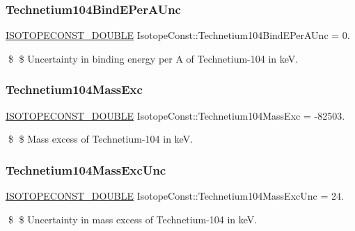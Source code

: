 \subsubsection{\texorpdfstring{Technetium104\+Bind\+E\+Per\+A\+Unc}{Technetium104BindEPerAUnc}}
{\footnotesize\ttfamily \mbox{\hyperlink{group___isotope_const-_macros_ga8f45a7272ce02c0b4c65c44636ed719a}{I\+S\+O\+T\+O\+P\+E\+C\+O\+N\+S\+T\+\_\+\+D\+O\+U\+B\+LE}} Isotope\+Const\+::\+Technetium104\+Bind\+E\+Per\+A\+Unc = 0.}

\$ \$ Uncertainty in binding energy per A of Technetium-\/104 in keV. \mbox{\label{group___isotope_const-_technetium-_tc104_ga6c5a60f6d5134017297d3fce356ab1af}} 
\subsubsection{\texorpdfstring{Technetium104\+Mass\+Exc}{Technetium104MassExc}}
{\footnotesize\ttfamily \mbox{\hyperlink{group___isotope_const-_macros_ga8f45a7272ce02c0b4c65c44636ed719a}{I\+S\+O\+T\+O\+P\+E\+C\+O\+N\+S\+T\+\_\+\+D\+O\+U\+B\+LE}} Isotope\+Const\+::\+Technetium104\+Mass\+Exc = -\/82503.}

\$ \$ Mass excess of Technetium-\/104 in keV. \mbox{\label{group___isotope_const-_technetium-_tc104_gae4fc82b143c40669958aa47e8b67c585}} 
\subsubsection{\texorpdfstring{Technetium104\+Mass\+Exc\+Unc}{Technetium104MassExcUnc}}
{\footnotesize\ttfamily \mbox{\hyperlink{group___isotope_const-_macros_ga8f45a7272ce02c0b4c65c44636ed719a}{I\+S\+O\+T\+O\+P\+E\+C\+O\+N\+S\+T\+\_\+\+D\+O\+U\+B\+LE}} Isotope\+Const\+::\+Technetium104\+Mass\+Exc\+Unc = 24.}

\$ \$ Uncertainty in mass excess of Technetium-\/104 in keV. \mbox{\label{group___isotope_const-_technetium-_tc104_ga8538cd35b27c6e8b05fd9109c60d4516}} 
